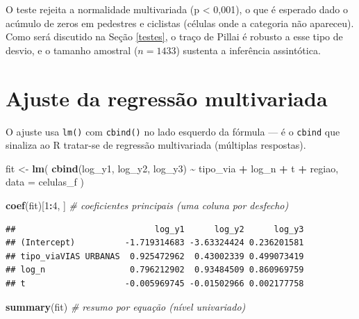 \documentclass[
  11pt,
]{article}
\newenvironment{Shaded}{\begin{snugshade}}{\end{snugshade}}
\newcommand{\AttributeTok}[1]{\textcolor[rgb]{0.13,0.29,0.53}{#1}}
\newcommand{\CommentTok}[1]{\textcolor[rgb]{0.56,0.35,0.01}{\textit{#1}}}
\newcommand{\DecValTok}[1]{\textcolor[rgb]{0.00,0.00,0.81}{#1}}
\newcommand{\FunctionTok}[1]{\textcolor[rgb]{0.13,0.29,0.53}{\textbf{#1}}}
\newcommand{\NormalTok}[1]{#1}
\newcommand{\OtherTok}[1]{\textcolor[rgb]{0.56,0.35,0.01}{#1}}
\newcommand{\SpecialCharTok}[1]{\textcolor[rgb]{0.81,0.36,0.00}{\textbf{#1}}}
\begin{document}
O teste rejeita a normalidade multivariada (p \textless{} 0,001), o que
é esperado dado o acúmulo de zeros em pedestres e ciclistas (células
onde a categoria não apareceu). Como será discutido na Seção
\ref{testes}, o traço de Pillai é robusto a esse tipo de desvio, e o
tamanho amostral (\(n = 1433\)) sustenta a inferência assintótica.

\newpage

\section{Ajuste da regressão
multivariada}\label{ajuste-da-regressuxe3o-multivariada}

O ajuste usa \texttt{lm()} com \texttt{cbind()} no lado esquerdo da
fórmula --- é o \texttt{cbind} que sinaliza ao R tratar-se de regressão
multivariada (múltiplas respostas).

\begin{Shaded}
\begin{Highlighting}[]
\NormalTok{fit }\OtherTok{\textless{}{-}} \FunctionTok{lm}\NormalTok{(}
  \FunctionTok{cbind}\NormalTok{(log\_y1, log\_y2, log\_y3) }\SpecialCharTok{\textasciitilde{}}\NormalTok{ tipo\_via }\SpecialCharTok{+}\NormalTok{ log\_n }\SpecialCharTok{+}\NormalTok{ t }\SpecialCharTok{+}\NormalTok{ regiao,}
  \AttributeTok{data =}\NormalTok{ celulas\_f}
\NormalTok{)}

\FunctionTok{coef}\NormalTok{(fit)[}\DecValTok{1}\SpecialCharTok{:}\DecValTok{4}\NormalTok{, ]   }\CommentTok{\# coeficientes principais (uma coluna por desfecho)}
\end{Highlighting}
\end{Shaded}

\begin{verbatim}
##                            log_y1      log_y2      log_y3
## (Intercept)          -1.719314683 -3.63324424 0.236201581
## tipo_viaVIAS URBANAS  0.925472962  0.43002339 0.499073419
## log_n                 0.796212902  0.93484509 0.860969759
## t                    -0.005969745 -0.01502966 0.002177758
\end{verbatim}

\begin{Shaded}
\begin{Highlighting}[]
\FunctionTok{summary}\NormalTok{(fit)       }\CommentTok{\# resumo por equação (nível univariado)}
\end{Highlighting}
\end{Shaded}
\end{document}
